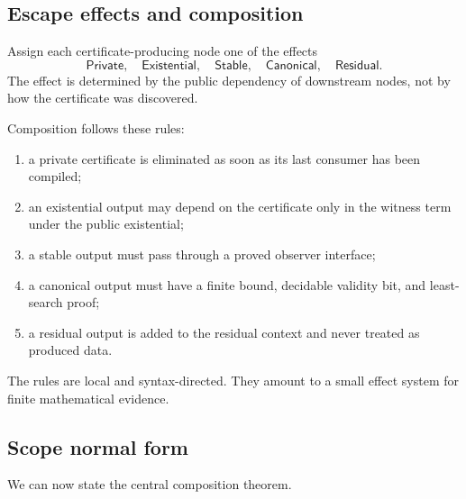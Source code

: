 \subsection{Escape effects and composition}

Assign each certificate-producing node one of the effects
\[
  \mathsf{Private},\quad \mathsf{Existential},\quad \mathsf{Stable},
  \quad \mathsf{Canonical},\quad \mathsf{Residual}.
\]
The effect is determined by the public dependency of downstream nodes, not by how the certificate was discovered.

Composition follows these rules:

\begin{enumerate}
\item a private certificate is eliminated as soon as its last consumer has been compiled;
\item an existential output may depend on the certificate only in the witness term under the public existential;
\item a stable output must pass through a proved observer interface;
\item a canonical output must have a finite bound, decidable validity bit, and least-search proof;
\item a residual output is added to the residual context and never treated as produced data.
\end{enumerate}

The rules are local and syntax-directed.  They amount to a small effect system for finite mathematical evidence.

\subsection{Scope normal form}

We can now state the central composition theorem.

